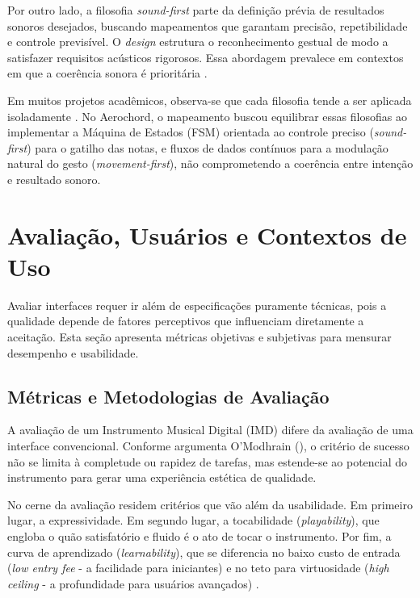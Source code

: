 Por outro lado, a filosofia \textit{sound-first} parte da definição prévia de resultados sonoros desejados, buscando mapeamentos que garantam precisão, repetibilidade e controle previsível. O \textit{design} estrutura o reconhecimento gestual de modo a satisfazer requisitos acústicos rigorosos. Essa abordagem prevalece em contextos em que a coerência sonora é prioritária \cite{wanderley2000gestural}.

Em muitos projetos acadêmicos, observa-se que cada filosofia tende a ser aplicada isoladamente \cite{aigner2012understanding, vogiatzidakis2018gesture}. No Aerochord, o mapeamento buscou equilibrar essas filosofias ao implementar a Máquina de Estados (FSM) orientada ao controle preciso (\textit{sound-first}) para o gatilho das notas, e fluxos de dados contínuos para a modulação natural do gesto (\textit{movement-first}), não comprometendo a coerência entre intenção e resultado sonoro.

\section{Avaliação, Usuários e Contextos de Uso}
\label{sec:avaliacao_usuarios_contextos}

Avaliar interfaces requer ir além de especificações puramente técnicas, pois a qualidade depende de fatores perceptivos que influenciam diretamente a aceitação. Esta seção apresenta métricas objetivas e subjetivas para mensurar desempenho e usabilidade.

\subsection{Métricas e Metodologias de Avaliação}
\label{subsec:metricas_metodologias}

A avaliação de um Instrumento Musical Digital (IMD) difere da avaliação de uma interface convencional. Conforme argumenta O’Modhrain (\citeyear{OModhrain2011}), o critério de sucesso não se limita à completude ou rapidez de tarefas, mas estende-se ao potencial do instrumento para gerar uma experiência estética de qualidade.

No cerne da avaliação residem critérios que vão além da usabilidade. Em primeiro lugar, a expressividade. Em segundo lugar, a tocabilidade (\textit{playability}), que engloba o quão satisfatório e fluido é o ato de tocar o instrumento. Por fim, a curva de aprendizado (\textit{learnability}), que se diferencia no baixo custo de entrada (\textit{low entry fee} - a facilidade para iniciantes) e no teto para virtuosidade (\textit{high ceiling} - a profundidade para usuários avançados) \cite{wanderley2002evaluation}.

